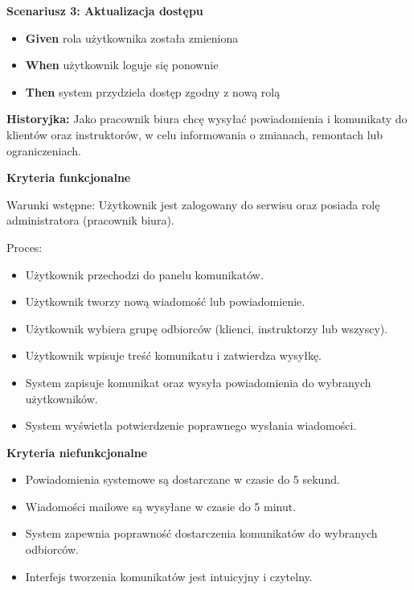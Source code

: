 \documentclass[a4paper,12pt]{article}
\begin{document}
\textbf{Scenariusz 3: Aktualizacja dostępu}
\begin{itemize}
    \item \textbf{Given} rola użytkownika została zmieniona
    \item \textbf{When} użytkownik loguje się ponownie
    \item \textbf{Then} system przydziela dostęp zgodny z nową rolą
\end{itemize}

\vspace{0,5cm}

\noindent \textbf{Historyjka:} Jako pracownik biura chcę wysyłać powiadomienia i komunikaty do klientów oraz instruktorów, w celu informowania o zmianach, remontach lub ograniczeniach.

\vspace{0,2cm}

\noindent \textbf{Kryteria funkcjonalne}

\vspace{0,2cm}

\noindent Warunki wstępne: Użytkownik jest zalogowany do serwisu oraz posiada rolę administratora (pracownik biura).

\vspace{0,2cm}

\noindent Proces:

\begin{itemize}
    \item Użytkownik przechodzi do panelu komunikatów.
    \item Użytkownik tworzy nową wiadomość lub powiadomienie.
    \item Użytkownik wybiera grupę odbiorców (klienci, instruktorzy lub wszyscy).
    \item Użytkownik wpisuje treść komunikatu i zatwierdza wysyłkę.
    \item System zapisuje komunikat oraz wysyła powiadomienia do wybranych użytkowników.
    \item System wyświetla potwierdzenie poprawnego wysłania wiadomości.
\end{itemize}

\noindent \textbf{Kryteria niefunkcjonalne}
\begin{itemize}
    \item Powiadomienia systemowe są dostarczane w czasie do 5 sekund.
    \item Wiadomości mailowe są wysyłane w czasie do 5 minut.
    \item System zapewnia poprawność dostarczenia komunikatów do wybranych odbiorców.
    \item Interfejs tworzenia komunikatów jest intuicyjny i czytelny.
\end{itemize}
\end{document}
